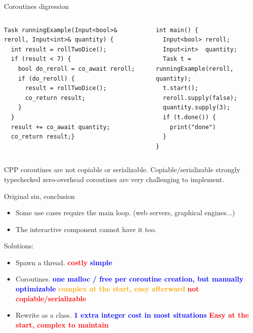 \documentclass[aspectratio=169,11pt]{beamer}
\begin{document}
\begin{frame}{Coroutines digression}

\noindent
  \begin{columns}[T,onlytextwidth]
    \begin{column}{0.50\textwidth}
\begin{lstlisting}[style=cppstyle,numbers=none]
Task runningExample(Input<bool>& reroll, Input<int>& quantity) {
  int result = rollTwoDice();
  if (result < 7) {
    bool do_reroll = co_await reroll;
    if (do_reroll) {
      result = rollTwoDice();
      co_return result;               
    }
  }
  result += co_await quantity;
  co_return result;}
\end{lstlisting}
\end{column}
    \begin{column}{0.45\textwidth}
\begin{lstlisting}[style=cppstyle,numbers=none]
int main() {
  Input<bool> reroll;
  Input<int>  quantity;
  Task t = runningExample(reroll, quantity);
  t.start(); 
  reroll.supply(false); 
  quantity.supply(3);
  if (t.done()) {
    print("done") 
  }
}
\end{lstlisting}
    \end{column}
\end{columns}

CPP coroutines are not copiable or serializable. Copiable/serializable strongly typechecked zero-overhead coroutines are very challenging to implement. 

\end{frame}

\begin{frame}{Original sin, conclusion}
\begin{itemize}
    \item Some use cases require the main loop. (web servers, graphical engines...)
    \item The interactive component cannot have it too.

\end{itemize}
    \begin{block}{Solutions:}
\begin{itemize}
    \item Spawn a thread. \textbf{\textcolor{red}{costly}} \textbf{\textcolor{blue} {simple}}
    \item Coroutines. \textbf{\textcolor{blue}{one malloc / free per coroutine creation, but manually optimizable}} \textbf{\textcolor{orange}{complex at the start, easy afterward}} \textcolor{red}{\textbf{not copiable/serializable}}
    \item Rewrite as a class. \textbf{\textcolor{blue}{1 extra integer cost in most situations}} \textbf{\textcolor{red}{Easy at the start, complex to maintain}}
\end{itemize}
    \end{block}
\end{frame}
\end{document}
